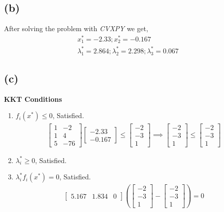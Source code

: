 \documentclass{article}
\begin{document}
\subsection*{(b)}
After solving the problem with \textit{CVXPY} we get,
\begin{gather*}
	x_1^* = -2.33;
	x_2^* = -0.167\\
	\lambda _{1}^* = 2.864; \lambda _{2}^* = 2.298;\lambda _{3}^* = 0.067
\end{gather*}
\subsection*{(c)}
\textbf{KKT Conditions}\\
\begin{enumerate}
	\item $f_i(x^*) \le 0$, Satisfied.\\
	\begin{gather*}
	\begin{bmatrix}
		1 & -2\\
		1 & 4\\
		5 & -76
		\end{bmatrix}\begin{bmatrix}
		-2.33\\
		-0.167
		\end{bmatrix} \le \begin{bmatrix}
		-2\\
		-3\\
		1
	\end{bmatrix}
	\implies \begin{bmatrix}
		-2\\
		-3\\
		1
	\end{bmatrix} \le \begin{bmatrix}
		-2\\
		-3\\
		1
	\end{bmatrix}
	\end{gather*}
	\item $\lambda _i^* \ge 0$, Satisfied.
	\item $\lambda _i^*f_i(x^*) = 0$, Satisfied.
	\begin{gather*}
		\begin{bmatrix}
		5.167 & 1.834 & 0
		\end{bmatrix}\left(\begin{bmatrix}
		-2\\
		-3\\
		1
	\end{bmatrix} - \begin{bmatrix}
		-2\\
		-3\\
		1
	\end{bmatrix}\right) = 0
	\end{gather*}
\end{enumerate}
\end{document}
